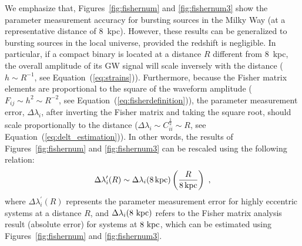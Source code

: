 \documentclass[%
 reprint,
 amsmath,amssymb,
 aps,
]{revtex4-2}
\begin{document}
We emphasize that, Figures~\ref{fig:fishernum} and \ref{fig:fishernum3} show the parameter measurement accuracy for bursting sources in the Milky Way (at a representative distance of $8$~kpc). However, these results can be generalized to
bursting sources in the local universe, provided the redshift is negligible. In particular, if a compact binary is located at a distance $R$ different from $8$~kpc, the overall amplitude of its GW signal will scale inversely with the distance ($h\sim R^{-1}$, see Equation~(\ref{eq:strains})). Furthermore, because the Fisher matrix elements are proportional to the square of the waveform amplitude ($F_{ij}\sim h^2\sim R^{-2}$, see Equation~(\ref{eq:fisherdefinition})), the parameter measurement error, $\Delta \lambda_i$, after inverting the Fisher matrix and taking the square root, should scale proportionally to the distance ($\Delta \lambda_{i}\sim C_{ii}^{\frac{1}{2}}\sim R$, see Equation~(\ref{eq:delt_estimation})). In other words, the results of Figures~\ref{fig:fishernum} and \ref{fig:fishernum3} can be rescaled using the following relation:
\begin{equation}
    \Delta \lambda_i^{\prime}(R)\sim \Delta \lambda_i(8\,{\rm kpc}) \left( \frac{R}{8\,{\rm kpc}}\right) \ ,
\end{equation}
where $\Delta \lambda_i^{\prime}(R)$ represents the parameter measurement error for highly eccentric systems at a distance $R$, and $\Delta \lambda_i(8~{\rm kpc})$ refers to the Fisher matrix analysis result (absolute error) for systems at $8~{\rm kpc}$, which can be estimated using Figures~\ref{fig:fishernum} and \ref{fig:fishernum3}.
\end{document}
